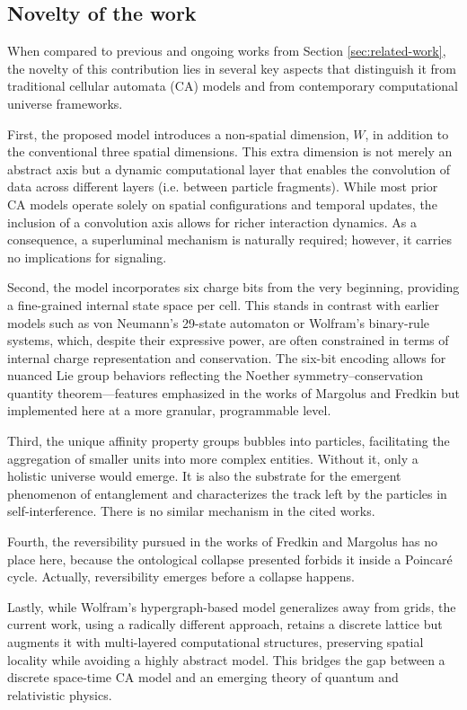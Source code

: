 \documentclass[12pt,english]{article}
\begin{document}
\subsection{Novelty of the work}

When compared to previous and ongoing works from Section \ref{sec:related-work}, the novelty of this contribution lies in several key aspects that distinguish it from traditional cellular automata (CA) models and from contemporary computational universe frameworks.

First, the proposed model introduces a non-spatial dimension, $W$, in addition to the conventional three spatial dimensions. This extra dimension is not merely an abstract axis but a dynamic computational layer that enables the convolution of data across different layers (i.e. between particle fragments). While most prior CA models operate solely on spatial configurations and temporal updates, the inclusion of a convolution axis allows for richer interaction dynamics. As a consequence, a superluminal mechanism is naturally required; however, it carries no implications for signaling.

Second, the model incorporates six charge bits from the very beginning, providing a fine-grained internal state space per cell. This stands in contrast with earlier models such as von Neumann’s 29-state automaton or Wolfram’s binary-rule systems, which, despite their expressive power, are often constrained in terms of internal charge representation and conservation. The six-bit encoding allows for nuanced Lie group behaviors reflecting the Noether symmetry–conservation quantity theorem—features emphasized in the works of Margolus and Fredkin but implemented here at a more granular, programmable level.

Third, the unique affinity property groups bubbles into particles, facilitating the aggregation of smaller units into more complex entities. Without it, only a holistic universe would emerge. It is also the substrate for the emergent phenomenon of entanglement and characterizes the track left by the particles in self-interference. There is no similar mechanism in the cited works.

Fourth, the reversibility pursued in the works of Fredkin and Margolus has no place here, because the ontological collapse presented forbids it inside a Poincaré cycle. Actually, reversibility emerges before a collapse happens.

Lastly, while Wolfram’s hypergraph-based model generalizes away from grids, the current work, using a radically different approach, retains a discrete lattice but augments it with multi-layered computational structures, preserving spatial locality while avoiding a highly abstract model. This bridges the gap between a discrete space-time CA model and an emerging theory of quantum and relativistic physics.
\end{document}
